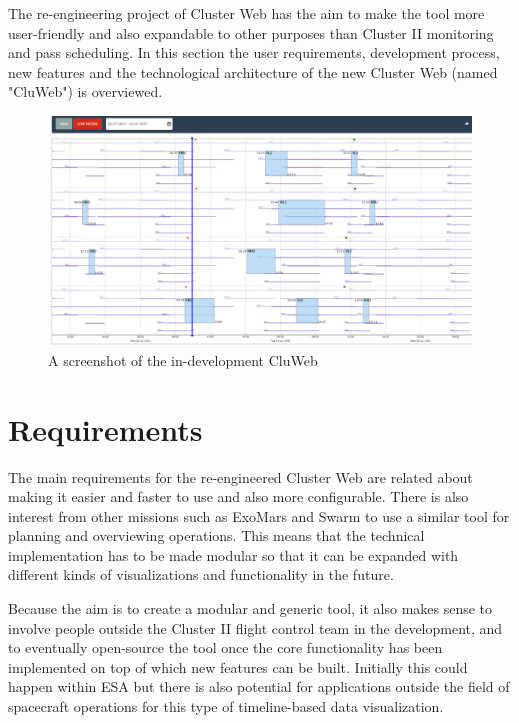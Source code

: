 
The re-engineering project of Cluster Web has the aim to make the tool more user-friendly and also expandable to other purposes than Cluster II monitoring and pass scheduling. In this section the user requirements, development process, new features and the technological architecture of the new Cluster Web (named "CluWeb") is overviewed.

\begin{figure}[ht]
  \begin{center}
    \includegraphics*[width=1\textwidth]{cluweb_dev}
  \end{center}
  \caption{A screenshot of the in-development CluWeb}
  \label{fig:cluweb}
\end{figure}

\section{Requirements}
    The main requirements for the re-engineered Cluster Web are related about making it easier and faster to use and also more configurable. There is also interest from other missions such as ExoMars and Swarm to use a similar tool for planning and overviewing operations. This means that the technical implementation has to be made modular so that it can be expanded with different kinds of visualizations and functionality in the future.

Because the aim is to create a modular and generic tool, it also makes sense to involve people outside the Cluster II flight control team in the development, and to eventually open-source the tool once the core functionality has been implemented on top of which new features can be built. Initially this could happen within ESA but there is also potential for applications outside the field of spacecraft operations for this type of timeline-based data visualization.

